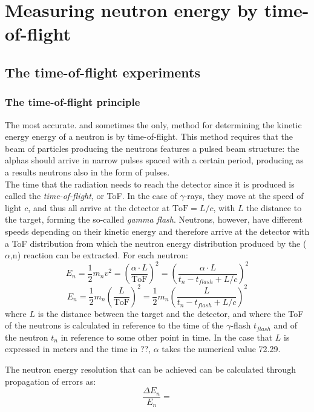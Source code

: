 \documentclass[a4paper,12pt]{report}
\newcommand{\an}{($\alpha$,n) }
\begin{document}
\chapter{Measuring neutron energy by time-of-flight}

\section{The time-of-flight experiments}
\subsection{The time-of-flight principle} 
The most accurate. and sometimes the only, method for determining the kinetic energy energy of a neutron is by time-of-flight.
This method requires that the beam of particles producing the neutrons features a pulsed beam structure: the alphas should arrive in narrow pulses spaced with a certain period, producing as a results neutrons also in the form of pulses.
\\

The time that the radiation needs to reach the detector since it is produced is called the \textit{time-of-flight}, or ToF.
In the case of $\gamma$-rays, they move at the speed of light $c$, and thus all arrive at the detector at $\text{ToF}=L/c$, with $L$ the distance to the target, forming the so-called  \textit{gamma flash}.
Neutrons, however, have different speeds depending on their kinetic energy and therefore arrive at the detector with a ToF distribution from which the neutron energy distribution produced by the \an reaction can be extracted.
For each neutron:
\begin{equation}
	E_n = \frac{1}{2}m_nv^2= \left ( \frac{\alpha \cdot L}{\text{ToF}} \right)^2=
	\left (\frac{\alpha \cdot L}{t_n-t_{flash}+L/c} \right)^2
	\label{Eq_ToF2En}
\end{equation}
\begin{equation}
	E_n=\frac{1}{2} m_n \left( \frac{L}{\text{ToF}} \right)^2 = \frac{1}{2} m_n \left( \frac{L}{t_n - t_{flash} + L/c} \right)^2
\end{equation}
where $L$ is the distance between the target and the detector, and where the ToF of the neutrons is calculated in reference to the time of the $\gamma$-flash $t_{flash}$ and of the neutron $t_n$ in reference to some other point in time.
In the case that $L$ is expressed in meters and the time in ??, $\alpha$ takes the numerical value 72.29. 

The neutron energy resolution that can be achieved can be calculated through propagation of errors as:
\begin{equation}
    \frac{\Delta E_n}{E_n} =
    \label{Eq_Enresolution}
\end{equation}
\end{document}
